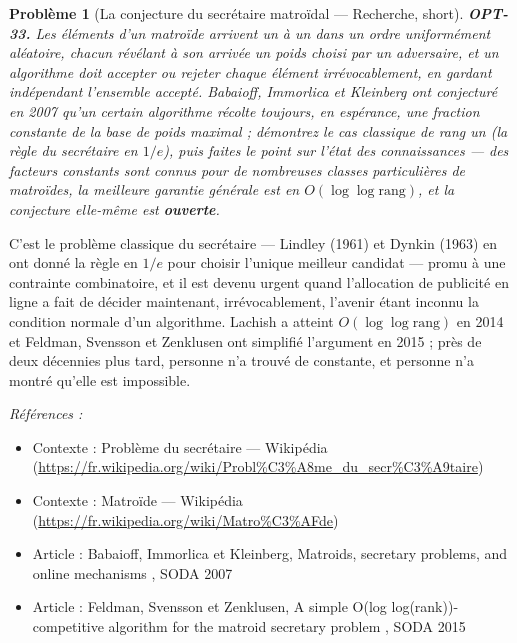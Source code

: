 \documentclass[11pt]{article}
\newtheorem{problem}{Problème}
\newenvironment{refs}{\par\small\noindent\emph{Références :}\begin{itemize}\setlength\itemsep{0pt}}{\end{itemize}\normalsize}
\begin{document}
\bigskip

\begin{problem}[{La conjecture du secrétaire matroïdal --- Recherche, short}]
\textbf{OPT-33.} Les éléments d'un matroïde arrivent un à un dans un ordre
uniformément aléatoire, chacun révélant à son arrivée un poids choisi par un adversaire, et un
algorithme doit accepter ou rejeter chaque élément irrévocablement, en gardant indépendant
l'ensemble accepté. Babaioff, Immorlica et Kleinberg ont conjecturé en 2007 qu'un certain
algorithme récolte toujours, en espérance, une fraction constante de la base de poids maximal ;
démontrez le cas classique de rang un (la règle du secrétaire en $1/e$), puis faites le point
sur l'état des connaissances --- des facteurs constants sont connus pour de nombreuses classes
particulières de matroïdes, la meilleure garantie générale est en
$O(\log\log \mathrm{rang})$, et la conjecture elle-même est \textbf{ouverte}.
\end{problem}

\noindent C'est le problème classique du secrétaire --- Lindley (1961) et Dynkin (1963)
en ont donné la règle en $1/e$ pour choisir l'unique meilleur candidat --- promu à une contrainte
combinatoire, et il est devenu urgent quand l'allocation de publicité en ligne a fait de
\og{} décider maintenant, irrévocablement, l'avenir étant inconnu \fg{} la condition normale d'un
algorithme. Lachish a atteint $O(\log\log \mathrm{rang})$ en 2014 et Feldman, Svensson et
Zenklusen ont simplifié l'argument en 2015 ; près de deux décennies plus tard, personne n'a
trouvé de constante, et personne n'a montré qu'elle est impossible.

\begin{refs}
\item Contexte : Problème du secrétaire --- Wikipédia (\url{https://fr.wikipedia.org/wiki/Probl%C3%A8me_du_secr%C3%A9taire})
\item Contexte : Matroïde --- Wikipédia (\url{https://fr.wikipedia.org/wiki/Matro%C3%AFde})
\item Article : Babaioff, Immorlica et Kleinberg, \og{} Matroids, secretary problems, and online mechanisms \fg{}, SODA 2007
\item Article : Feldman, Svensson et Zenklusen, \og{} A simple O(log log(rank))-competitive algorithm for the matroid secretary problem \fg{}, SODA 2015
\end{refs}

\bigskip
\end{document}
